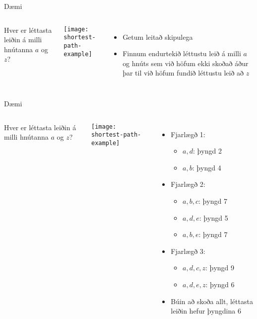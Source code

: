 \documentclass{beamer}
\begin{document}
\begin{frame}{Dæmi}
\begin{columns}
Hver er léttasta leiðin á milli hnútanna $a$ og $z$?
\begin{center}
\texttt{[image: shortest-path-example]}
\end{center}
\begin{itemize}
 \item Getum leitað skipulega
 \item Finnum endurtekið léttustu leið á milli $a$ og hnúts sem við höfum ekki skoðað áður þar til við höfum fundið léttustu leið að $z$
\end{itemize}
\end{columns}
\end{frame}

\begin{frame}{Dæmi}
\begin{columns}
Hver er léttasta leiðin á milli hnútanna $a$ og $z$?
\begin{center}
\texttt{[image: shortest-path-example]}
\end{center}
\begin{itemize}
 \item Fjarlægð 1:
 \begin{itemize}
  \item $a, d$: þyngd 2
  \item $a, b$: þyngd 4
 \end{itemize} \pause
 \item Fjarlægð 2:
 \begin{itemize}
  \item $a, b, c$: þyngd 7
  \item $a, d, e$: þyngd 5
  \item $a, b, e$: þyngd 7
 \end{itemize} \pause
 \item Fjarlægð 3:
 \begin{itemize}
  \item $a, d, c, z$: þyngd 9
  \item $a, d, e, z$: þyngd 6
 \end{itemize}
 \item Búin að skoða allt, léttasta leiðin hefur þyngdina 6
\end{itemize}
\end{columns}
\end{frame}
\end{document}
